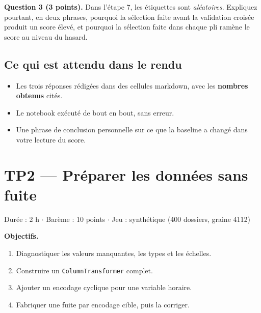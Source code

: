 \documentclass[10pt,a4paper]{article}
\begin{document}
\begin{bareme}
\textbf{Question 3 (3 points).}
Dans l'étape 7, les étiquettes sont \emph{aléatoires}. Expliquez pourtant, en
deux phrases, pourquoi la sélection faite avant la validation croisée produit un
score élevé, et pourquoi la sélection faite dans chaque pli ramène le score au
niveau du hasard.
\end{bareme}

\subsection*{Ce qui est attendu dans le rendu}
\begin{itemize}
  \item Les trois réponses rédigées dans des cellules markdown, avec les
        \textbf{nombres obtenus} cités.
  \item Le notebook exécuté de bout en bout, sans erreur.
  \item Une phrase de conclusion personnelle sur ce que la baseline a changé
        dans votre lecture du score.
\end{itemize}

\newpage
\section{TP2 --- Préparer les données sans fuite}
{\color{gris}\small Durée : 2 h $\cdot$ Barème : 10 points $\cdot$
Jeu : synthétique (400 dossiers, graine 4112)}

\begin{obj}
\textbf{Objectifs.}
\begin{enumerate}
  \item Diagnostiquer les valeurs manquantes, les types et les échelles.
  \item Construire un \texttt{ColumnTransformer} complet.
  \item Ajouter un encodage cyclique pour une variable horaire.
  \item Fabriquer une fuite par encodage cible, puis la corriger.
\end{enumerate}
\end{obj}
\end{document}
